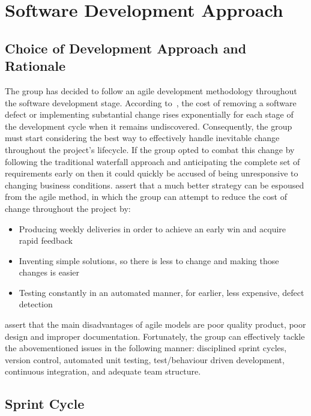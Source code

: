 \section{Software Development Approach}

\subsection{Choice of Development Approach and Rationale}

The group has decided to follow an agile development methodology throughout the software development stage. According to~\cite{book:software_engineering_economics}, the cost of removing a software defect or implementing substantial change rises exponentially for each stage of the development cycle when it remains undiscovered. Consequently, the group must start considering the best way to effectively handle inevitable change throughout the project’s lifecycle. If the group opted to combat this change by following the traditional waterfall approach and anticipating the complete set of requirements early on then it could quickly be accused of being unresponsive to changing business conditions. \cite{art:agile_business_innovation} assert that a much better strategy can be espoused from the agile method, in which the group can attempt to reduce the cost of change throughout the project by:

\begin{itemize}
  \item Producing weekly deliveries in order to achieve an early win and acquire rapid feedback
  \item Inventing simple solutions, so there is less to change and making those changes is easier
  \item Testing constantly in an automated manner, for earlier, less expensive, defect detection
\end{itemize}

\cite{art:adaptive_sdpm} assert that the main disadvantages of agile models are poor quality product, poor design and improper documentation. Fortunately, the group can effectively tackle the abovementioned issues in the following manner: disciplined sprint cycles, version control, automated unit testing, test/behaviour driven development, continuous integration, and adequate team structure.

\subsection{Sprint Cycle}

